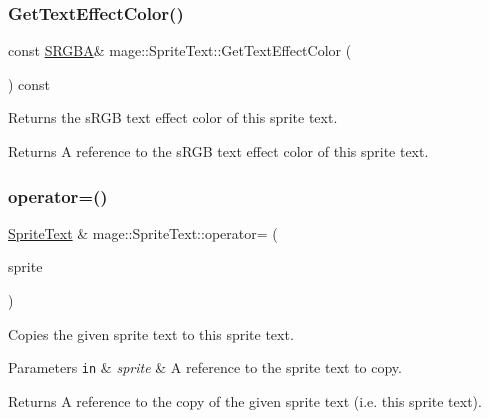 \subsubsection{\texorpdfstring{Get\+Text\+Effect\+Color()}{GetTextEffectColor()}\hspace{0.1cm}{\footnotesize\ttfamily [2/2]}}
{\footnotesize\ttfamily const \hyperlink{structmage_1_1_s_r_g_b_a}{S\+R\+G\+BA}\& mage\+::\+Sprite\+Text\+::\+Get\+Text\+Effect\+Color (\begin{DoxyParamCaption}{ }\end{DoxyParamCaption}) const\hspace{0.3cm}{\ttfamily [noexcept]}}

Returns the s\+R\+GB text effect color of this sprite text.

\begin{DoxyReturn}{Returns}
A reference to the s\+R\+GB text effect color of this sprite text. 
\end{DoxyReturn}
\hypertarget{classmage_1_1_sprite_text_a727e8c9e79fb0caab58c9121e798467b}{}\label{classmage_1_1_sprite_text_a727e8c9e79fb0caab58c9121e798467b} 
\subsubsection{\texorpdfstring{operator=()}{operator=()}\hspace{0.1cm}{\footnotesize\ttfamily [1/2]}}
{\footnotesize\ttfamily \hyperlink{classmage_1_1_sprite_text}{Sprite\+Text} \& mage\+::\+Sprite\+Text\+::operator= (\begin{DoxyParamCaption}\item[{const \hyperlink{classmage_1_1_sprite_text}{Sprite\+Text} \&}]{sprite }\end{DoxyParamCaption})\hspace{0.3cm}{\ttfamily [default]}}

Copies the given sprite text to this sprite text.


\begin{DoxyParams}[1]{Parameters}
\mbox{\tt in}  & {\em sprite} & A reference to the sprite text to copy. \\
\hline
\end{DoxyParams}
\begin{DoxyReturn}{Returns}
A reference to the copy of the given sprite text (i.\+e. this sprite text). 
\end{DoxyReturn}
\hypertarget{classmage_1_1_sprite_text_a203a5e33e16d412691d43928809e5a50}{}\label{classmage_1_1_sprite_text_a203a5e33e16d412691d43928809e5a50} 
